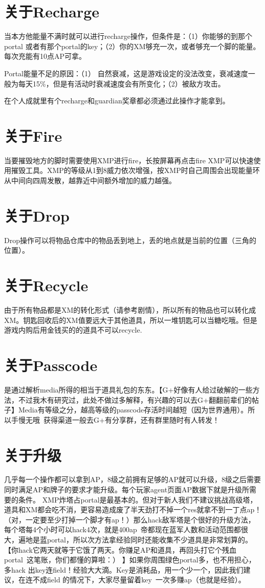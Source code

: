 \documentclass[12pt]{article}
\theoremstyle{definition}
\theoremstyle{remark}
\numberwithin{equation}{section}
\begin{document}
\section{关于Recharge}
当本方他能量不满时就可以进行recharge操作，但条件是：（1）你能够的到那个portal 或者有那个portal的key；（2）你的XM够充一次，或者够充一个脚的能量。每次充能有10点AP可拿。\par
Portal能量不足的原因：（1） 自然衰减，这是游戏设定的没法改变，衰减速度一般为每天15\%，但是有活动时衰减速度会有所变化；（2）被敌方攻击。\par
在个人成就里有个recharge和guardian奖章都必须通过此操作才能拿到。

\section{关于Fire}
当要摧毁地方的脚时需要使用XMP进行fire，长按屏幕再点击fire XMP可以快速使用摧毁工具。XMP的等级从1到8威力依次增强，按XMP时自己周围会出现能量环从中间向四周发散，越靠近中间额外增加的威力越强。

\section{关于Drop}
Drop操作可以将物品仓库中的物品丢到地上，丢的地点就是当前的位置（三角的位置）。

\section{关于Recycle}
由于所有物品都是XM的转化形式（请参考剧情），所以所有的物品也可以转化成XM。钥匙回收后的XM值要远大于其他道具，所以一堆钥匙可以当糖吃哦。但是游戏内购后用金钱买的的道具不可以recycle.

\section{关于Passcode}
是通过解析media所得的相当于道具礼包的东东。【G+好像有人给过破解的一些方法，不过我木有研究过，此处不做过多解释，有兴趣的可以去G+翻翻前辈们的帖子】Media有等级之分，越高等级的passcode存活时间越短（因为世界通用）。所以手慢无哦~获得渠道一般去G+有分享群，还有群里随时有人转发！

\section{关于升级}
几乎每一个操作都可以拿到AP，8级之前拥有足够的AP就可以升级，8级之后需要同时满足AP和牌子的要求才能升级。每个玩家agent页面AP数据下就是升级所需要的条件。
XMP炸塔占portal是最基本的。但对于新人我们不建议挑战高级塔，道具和XM都会吃不消，更容易造成废了半天劲打不掉一个res就拿不到一丁点ap！（对，一定要至少打掉一个脚才有ap！）那么hack敌军塔是个很好的升级方法，每个塔每4个小时可以hack4次，就是400ap~帝都现在蓝军人数和活动范围都很大，遍地是蓝portal，所以次方法拿经验同时还能收集不少道具是非常划算的。【你hack它两天就等于它饿了两天。你赚足AP和道具，再回头打它个残血portal~这笔账，你们都懂的算啦：） 】如果你周围绿色portal多，也不用担心，多hack 出key连field！经验大大滴。Key是消耗品，用一个少一个，因此我们建议，在连不成field 的情况下，大家尽量留着key~一次多赚ap（也就是经验）。
\end{document}
